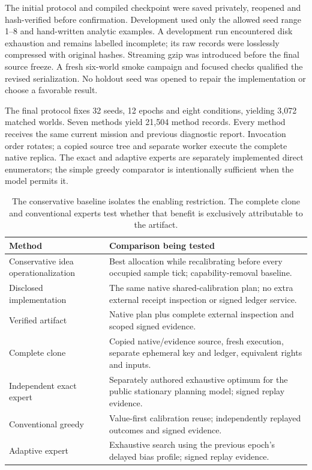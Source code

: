 The initial protocol and compiled checkpoint were saved privately, reopened and hash-verified before confirmation. Development used only the allowed seed range 1--8 and hand-written analytic examples. A development run encountered disk exhaustion and remains labelled incomplete; its raw records were losslessly compressed with original hashes. Streaming gzip was introduced before the final source freeze. A fresh six-world smoke campaign and focused checks qualified the revised serialization. No holdout seed was opened to repair the implementation or choose a favorable result.

The final protocol fixes 32 seeds, 12 epochs and eight conditions, yielding 3,072 matched worlds. Seven methods yield 21,504 method records. Every method receives the same current mission and previous diagnostic report. Invocation order rotates; a copied source tree and separate worker execute the complete native replica. The exact and adaptive experts are separately implemented direct enumerators; the simple greedy comparator is intentionally sufficient when the model permits it.

\begin{table}[H]\small\renewcommand{\arraystretch}{1.13}
\begin{tabularx}{\textwidth}{@{}p{}X@{}}\toprule
Method & Comparison being tested\\\midrule
Conservative idea operationalization & Best allocation while recalibrating before every occupied sample tick; capability-removal baseline.\\
Disclosed implementation & The same native shared-calibration plan; no extra external receipt inspection or signed ledger service.\\
Verified artifact & Native plan plus complete external inspection and scoped signed evidence.\\
Complete clone & Copied native/evidence source, fresh execution, separate ephemeral key and ledger, equivalent rights and inputs.\\
Independent exact expert & Separately authored exhaustive optimum for the public stationary planning model; signed replay evidence.\\
Conventional greedy & Value-first calibration reuse; independently replayed outcomes and signed evidence.\\
Adaptive expert & Exhaustive search using the previous epoch's delayed bias profile; signed replay evidence.\\\bottomrule
\end{tabularx}
\caption{The conservative baseline isolates the enabling restriction. The complete clone and conventional experts test whether that benefit is exclusively attributable to the artifact.}
\end{table}

